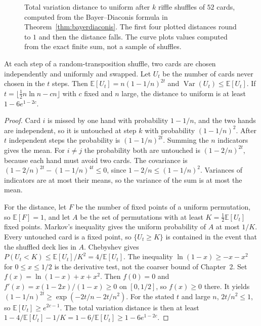 \begin{figure}[ht]
\centering
{}
\caption{Total variation distance to uniform after $k$ riffle shuffles of $52$ cards, computed from the Bayer--Diaconis formula in Theorem~\ref{thm:bayerdiaconis}. The first four plotted distances round to $1$ and then the distance falls. The curve plots values computed from the exact finite sum, not a sample of shuffles.}
\label{fig:riffle}
\end{figure}

\begin{proposition}\label{prop:untouched}
At each step of a random-transposition shuffle, two cards are chosen independently and uniformly and swapped. Let $U_t$ be the number of cards never chosen in the $t$ steps. Then $\mathbb E[U_t]=n(1-1/n)^{2t}$ and $\operatorname{Var}(U_t)\le\mathbb E[U_t]$. If $t=\lfloor\frac12 n\ln n-cn\rfloor$ with $c$ fixed and $n$ large, the distance to uniform is at least $1-6e^{1-2c}$.
\end{proposition}
\begin{proof}
Card $i$ is missed by one hand with probability $1-1/n$, and the two hands are independent, so it is untouched at step $k$ with probability $(1-1/n)^2$. After $t$ independent steps the probability is $(1-1/n)^{2t}$. Summing the $n$ indicators gives the mean. For $i\ne j$ the probability both are untouched is $(1-2/n)^{2t}$, because each hand must avoid two cards. The covariance is $(1-2/n)^{2t}-(1-1/n)^{4t}\le 0$, since $1-2/n\le(1-1/n)^2$. Variances of indicators are at most their means, so the variance of the sum is at most the mean.

For the distance, let $F$ be the number of fixed points of a uniform permutation, so $\mathbb E[F]=1$, and let $A$ be the set of permutations with at least $K=\frac12\mathbb E[U_t]$ fixed points. Markov's inequality gives the uniform probability of $A$ at most $1/K$. Every untouched card is a fixed point, so $\{U_t\ge K\}$ is contained in the event that the shuffled deck lies in $A$. Chebyshev gives $P(U_t<K)\le\mathbb E[U_t]/K^2=4/\mathbb E[U_t]$. The inequality $\ln(1-x)\ge -x-x^2$ for $0\le x\le 1/2$ is the derivative test, not the coarser bound of Chapter~2. Set $f(x)=\ln(1-x)+x+x^2$. Then $f(0)=0$ and $f'(x)=x(1-2x)/(1-x)\ge 0$ on $[0,1/2]$, so $f(x)\ge 0$ there. It yields $(1-1/n)^{2t}\ge\exp(-2t/n-2t/n^2)$. For the stated $t$ and large $n$, $2t/n^2\le 1$, so $\mathbb E[U_t]\ge e^{2c-1}$. The total variation distance is then at least $1-4/\mathbb E[U_t]-1/K=1-6/\mathbb E[U_t]\ge 1-6e^{1-2c}$.
\end{proof}

